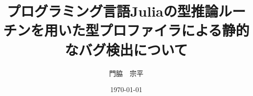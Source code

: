 \documentclass[uplatex, a4paper, 12pt]{jsarticle}
\theoremstyle{definition}
\begin{document}
\title{プログラミング言語Juliaの型推論ルーチンを用いた型プロファイラによる静的なバグ検出について}
\author{門脇　宗平}
\date{\today}
\maketitle
\vspace{\fill}

\vspace{\fill}
\newpage

\setcounter{tocdepth}{3}
\tableofcontents

\newpage









\end{document}
